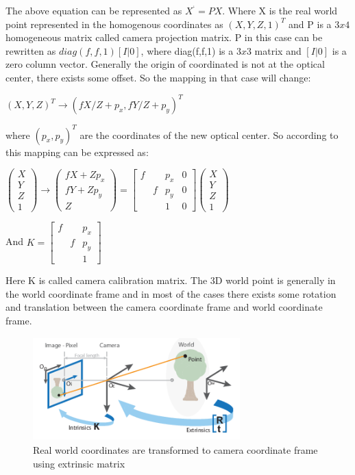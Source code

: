 The above equation can be represented as  $X^{‘} = PX $. Where X is the real world point represented in the homogenous coordinates as $(X, Y, Z, 1)^{T}$ and P is a $3x4$ homogeneous matrix called camera projection matrix. P in this case can be rewritten as $diag(f,f,1) [I|0]$, where diag(f,f,1) is a $3x3$ matrix and $[I|0]$ is a zero column vector. 
Generally the origin of coordinated is not at the optical center, there exists some offset. So the mapping in that case will change: 
\begin{center}
$(X,Y,Z)^{T} \rightarrow (fX/Z + p_{x}, fY/Z + p_{y})^{T}$
\end{center}
 where $(p_{x}, p_{y})^{T}$ are the coordinates of the new optical center. So according to this mapping can be expressed as:
   \begin{center}
$\left(\begin{array}{c}X \\ Y \\ Z \\ 1 \end{array}\right) \rightarrow \left(\begin{array}{c} fX + Zp_{x} \\ fY + Zp_{y} \\ Z \end{array}\right) = \begin{bmatrix}f & &p_{x} & 0 \\  &f &p_{y} & 0  \\   & &1 & 0   \end{bmatrix}\left(\begin{array}{c}X\\ Y  \\Z \\ 1 \end{array}\right)$

And $ K =  \begin{bmatrix}f & &p_{x} \\  &f &p_{y}  \\   & &1    \end{bmatrix}$
\end{center}
 Here K is called camera calibration matrix. The 3D world point is generally in the world coordinate frame and in most of the cases there exists some rotation and translation between the camera coordinate frame and world coordinate frame.
 
    \begin{figure}[h]
    \centering
    \includegraphics[width=8cm, height =4cm]{images/camera_geo.png}
    \caption{ Real world coordinates are transformed to camera coordinate frame using extrinsic matrix \cite{10.5555/861369}}
    \end{figure}
    
